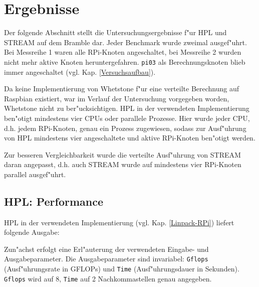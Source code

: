 
\section{Ergebnisse}\label{Ergebnisse}

Der folgende Abschnitt stellt die Untersuchungsergebnisse f"ur HPL und STREAM auf dem Bramble dar. Jeder Benchmark wurde zweimal ausgef"uhrt. Bei Messreihe 1 waren alle RPi-Knoten angeschaltet, bei Messreihe 2 wurden nicht mehr aktive Knoten heruntergefahren. \texttt{pi03} als Berechnungsknoten blieb immer angeschaltet (vgl. Kap. \ref{Versuchsaufbau}).

Da keine Implementierung von Whetstone f"ur eine verteilte Berechnung auf Raspbian existiert, war im Verlauf der Untersuchung vorgegeben worden, Whetstone nicht zu ber"ucksichtigen. HPL in der verwendeten Implementierung ben"otigt mindestens vier CPUs oder parallele Prozesse. Hier wurde jeder CPU, d.h. jedem RPi-Knoten, genau ein Prozess zugewiesen, sodass zur Ausf"uhrung von HPL mindestens vier angeschaltete und aktive RPi-Knoten ben"otigt werden. 

Zur besseren Vergleichbarkeit wurde die verteilte Ausf"uhrung von STREAM daran angepasst, d.h. auch STREAM wurde auf mindestens vier RPi-Knoten parallel ausgef"uhrt. 

\subsection{HPL: Performance}\label{Ergebnisse-HPL}

HPL in der verwendeten Implementierung (vgl. Kap. \ref{Linpack-RPi}) liefert folgende Ausgabe:

Zun"achst erfolgt eine Erl"auterung der verwendeten Eingabe- und Ausgabeparameter. Die Ausgabeparameter sind invariabel: \texttt{Gflops} (Ausf"uhrungsrate in GFLOPs) und \texttt{Time} (Ausf"uh\-rungsdauer in Sekunden). \texttt{Gflops} wird auf 8, \texttt{Time} auf 2 Nachkommastellen genau angegeben.

